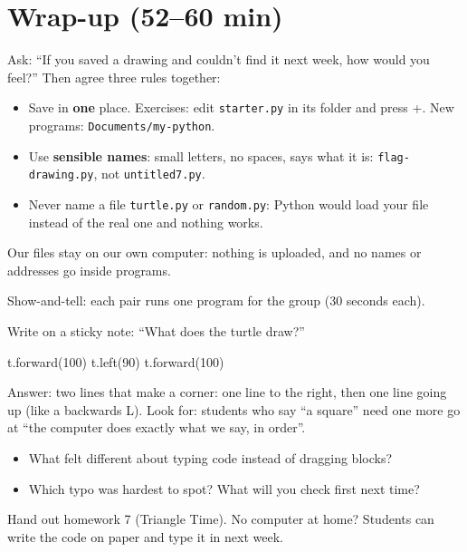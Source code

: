 \section{Wrap-up (52--60 min)}
\begin{safety}
Ask: \enquote{If you saved a drawing and couldn't find it next week, how would you feel?} Then agree three rules together:
\begin{itemize}[leftmargin=1.2em,itemsep=1pt]
  \item Save in \textbf{one} place. Exercises: edit \texttt{starter.py} in its folder and press +. New programs: \texttt{Documents/my-python}.
  \item Use \textbf{sensible names}: small letters, no spaces, says what it is: \texttt{flag-drawing.py}, not \texttt{untitled7.py}.
  \item Never name a file \texttt{turtle.py} or \texttt{random.py}: Python would load your file instead of the real one and nothing works.
\end{itemize}
Our files stay on our own computer: nothing is uploaded, and no names or addresses go inside programs.
\end{safety}
Show-and-tell: each pair runs one program for the group (30 seconds each).
\begin{formativecheck}
Write on a sticky note: \enquote{What does the turtle draw?}
\begin{pycode}
t.forward(100)
t.left(90)
t.forward(100)
\end{pycode}
Answer: two lines that make a corner: one line to the right, then one line going up (like a backwards L). Look for: students who say \enquote{a square} need one more go at \enquote{the computer does exactly what we say, in order}.
\end{formativecheck}
\begin{reflection}
\begin{itemize}[leftmargin=1.2em,itemsep=1pt]
  \item What felt different about typing code instead of dragging blocks?
  \item Which typo was hardest to spot? What will you check first next time?
\end{itemize}
Hand out homework 7 (Triangle Time). No computer at home? Students can write the code on paper and type it in next week.
\end{reflection}

